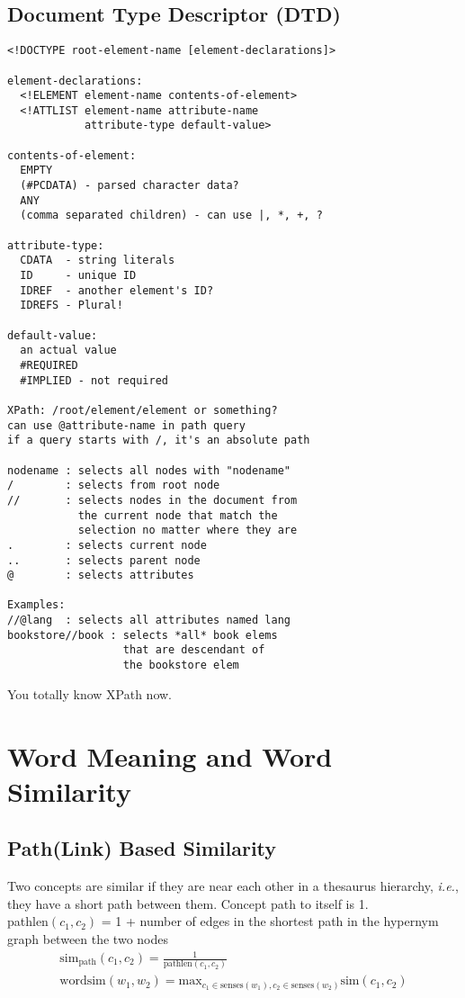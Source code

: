 \documentclass[10pt,twocolumn]{amsart}
\begin{document}
\subsection{Document Type Descriptor (DTD)}
\begin{verbatim}
<!DOCTYPE root-element-name [element-declarations]>

element-declarations:
  <!ELEMENT element-name contents-of-element>
  <!ATTLIST element-name attribute-name
            attribute-type default-value>

contents-of-element: 
  EMPTY
  (#PCDATA) - parsed character data?
  ANY
  (comma separated children) - can use |, *, +, ?

attribute-type: 
  CDATA  - string literals
  ID     - unique ID
  IDREF  - another element's ID?
  IDREFS - Plural!

default-value:
  an actual value
  #REQUIRED
  #IMPLIED - not required

XPath: /root/element/element or something?
can use @attribute-name in path query
if a query starts with /, it's an absolute path

nodename : selects all nodes with "nodename"
/        : selects from root node
//       : selects nodes in the document from
           the current node that match the
           selection no matter where they are
.        : selects current node
..       : selects parent node
@        : selects attributes

Examples:
//@lang  : selects all attributes named lang
bookstore//book : selects *all* book elems
                  that are descendant of
                  the bookstore elem
\end{verbatim}
You totally know XPath now.
\section{Word Meaning and Word Similarity}
\subsection{Path(Link) Based Similarity}
Two concepts are similar if they are near each other in a thesaurus hierarchy,
\emph{i.e.}, they have a short path between them. Concept path to itself is 1. \\

pathlen$(c_{1},c_{2})$ = 1 + number of edges in the shortest path in
                        the hypernym graph between the two nodes\\
\begin{gather*}
\text{sim}_{\text{path}}(c_{1},c_{2}) = \frac{1}{\text{pathlen}(c_1,c_2)}\\
\text{wordsim}(w_1,w_2) = \text{max}_{c_1 \in \text{senses}(w_{1}),
                                      c_2 \in \text{senses}(w_{2})} 
                          \text{sim}(c_{1},c_{2})
\end{gather*}
\end{document}
